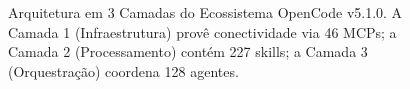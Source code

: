 \begin{figure}[H]
{%
}
\caption{Arquitetura em 3 Camadas do Ecossistema OpenCode v5.1.0. A Camada 1 (Infraestrutura) prov\^e conectividade via 46 MCPs; a Camada 2 (Processamento) cont\'em 227 skills; a Camada 3 (Orquestra\c{c}\~ao) coordena 128 agentes.}
\label{fig:arquitetura-3camadas}
\end{figure}
